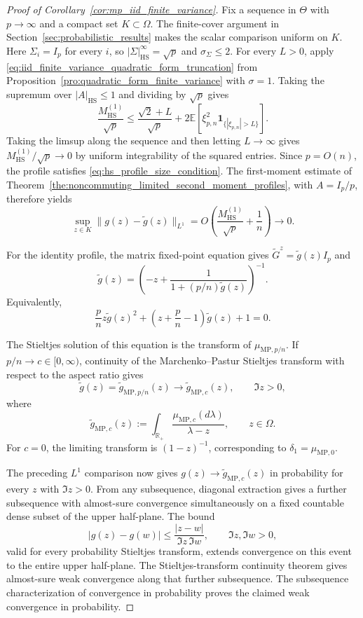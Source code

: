 \documentclass[EJP, preprint, NODS, nobera, nofontexpansion]{ejpecp}
\DeclareMathOperator{\hs}{HS}
\begin{document}
\begin{proof}[Proof of Corollary~\ref{cor:mp_iid_finite_variance}]
Fix a sequence in $\Theta$ with $p\to\infty$ and a compact set
$K\subset\Omega$. The finite-cover argument in
Section~\ref{sec:probabilistic_results} makes the scalar comparison
uniform on $K$. Here $\Sigma_i=I_p$ for every $i$, so
$|\Sigma|_{\hs}^\infty=\sqrt p$ and $\sigma_\Sigma\leq2$.
For every $L>0$, apply
\eqref{eq:iid_finite_variance_quadratic_form_truncation} from
Proposition~\ref{pro:quadratic_form_finite_variance} with $\sigma=1$.
Taking the supremum over $|A|_{\hs}\leq1$ and dividing by $\sqrt p$ gives
\[
    \frac{M_{\hs}^{(1)}}{\sqrt p}
    \leq\frac{\sqrt2+L}{\sqrt p}
    +2\mathbb E\!\left[
      \xi_{p,n}^2\mathbf1_{\{|\xi_{p,n}|>L\}}
    \right].
\]
Taking the limsup along the sequence and then letting \(L\to\infty\)
gives \(M_{\hs}^{(1)}/\sqrt p\to0\) by uniform integrability
of the squared entries.
Since $p=O(n)$, the profile satisfies \eqref{eq:hs_profile_size_condition}.
The first-moment estimate of
Theorem~\ref{the:noncommuting_limited_second_moment_profiles}, with
$A=I_p/p$, therefore yields
\[
 \sup_{z\in K}\|g(z)-\tilde g(z)\|_{L^1}
 =O\left(\frac{M_{\hs}^{(1)}}{\sqrt p}+\frac1n\right)
 \longrightarrow0.
\]

For the identity profile, the matrix fixed-point equation gives
$\tilde G^z=\tilde g(z)I_p$ and
\[
 \tilde g(z)
 =\left(-z+\frac1{1+(p/n)\tilde g(z)}\right)^{-1}.
\]
Equivalently,
\[
 \frac pn z\tilde g(z)^2
 +\left(z+\frac pn-1\right)\tilde g(z)+1=0.
\]

The Stieltjes solution of this equation is the transform of
\(\mu_{\mathrm{MP},p/n}\). If \(p/n\to c\in[0,\infty)\),
continuity of the Marchenko--Pastur Stieltjes transform with respect
to the aspect ratio gives
\[
    \tilde g(z)=\tilde g_{\mathrm{MP},p/n}(z)
    \longrightarrow \tilde g_{\mathrm{MP},c}(z),
    \qquad \Im z>0,
\]
where
\[
    \tilde g_{\mathrm{MP},c}(z)
    :=\int_{\mathbb R_+}\frac{\mu_{\mathrm{MP},c}(d\lambda)}{\lambda-z},
    \qquad z\in\Omega.
\]
For $c=0$, the limiting transform is $(1-z)^{-1}$, corresponding to
$\delta_1=\mu_{\mathrm{MP},0}$.

The preceding $L^1$ comparison now gives
$g(z)\to \tilde g_{\mathrm{MP},c}(z)$ in probability for every
$z$ with $\Im z>0$.  From any subsequence, diagonal extraction gives a
further subsequence with almost-sure convergence simultaneously on a
fixed countable dense subset of the upper half-plane.
The bound
\[
 |g(z)-g(w)|\leq\frac{|z-w|}{\Im z\,\Im w},
 \qquad \Im z,\Im w>0,
\]
valid for every probability Stieltjes transform, extends convergence on
this event to the entire upper half-plane.
The Stieltjes-transform continuity theorem
\cite[Theorem~B.9]{BaiSilverstein2010} gives almost-sure weak convergence
along that further subsequence.  The subsequence characterization of
convergence in probability proves the claimed weak convergence in
probability.
\end{proof}
\end{document}

